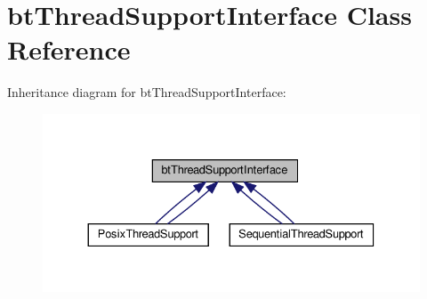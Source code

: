 \hypertarget{classbtThreadSupportInterface}{}\section{bt\+Thread\+Support\+Interface Class Reference}
\label{classbtThreadSupportInterface}


Inheritance diagram for bt\+Thread\+Support\+Interface\+:
\nopagebreak
\begin{figure}[H]
\begin{center}
\leavevmode
\includegraphics[width=330pt]{classbtThreadSupportInterface__inherit__graph}
\end{center}
\end{figure}
